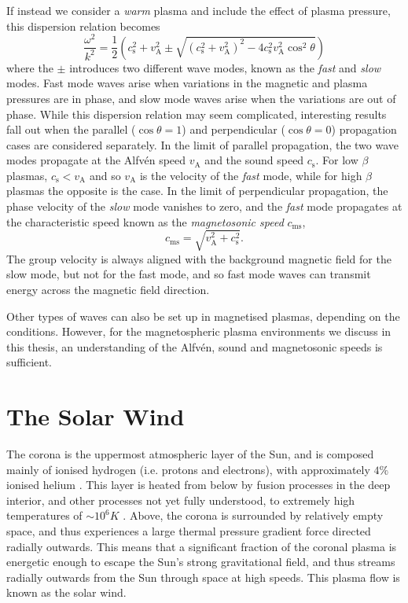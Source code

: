 If instead we consider a \textit{warm} plasma and include the effect of plasma pressure, this dispersion relation becomes
\begin{equation}
\frac{\omega^2}{k^2} = \frac{1}{2}\left(c_\mathrm{s}^2+v_\mathrm{A}^2\pm\sqrt{(c_\mathrm{s}^2+v_\mathrm{A}^2)^2-4c_\mathrm{s}^2v_\mathrm{A}^2\cos^2\theta}\right)
\end{equation}
where the $\pm$ introduces two different wave modes, known as the \textit{fast} and \textit{slow} modes. Fast mode waves arise when variations in the magnetic and plasma pressures are in phase, and slow mode waves arise when the variations are out of phase. While this dispersion relation may seem complicated, interesting results fall out when the parallel ($\cos\theta = 1$) and perpendicular ($\cos\theta = 0$) propagation cases are considered separately. In the limit of parallel propagation, the two wave modes propagate at the Alfv\'en speed $v_\mathrm{A}$ and the sound speed $c_\mathrm{s}$. For low $\beta$ plasmas, $c_\mathrm{s}<v_\mathrm{A}$ and so $v_\mathrm{A}$ is the velocity of the \textit{fast} mode, while for high $\beta$ plasmas the opposite is the case. In the limit of perpendicular propagation, the phase velocity of the \textit{slow} mode vanishes to zero, and the \textit{fast} mode propagates at the characteristic speed known as the \textit{magnetosonic speed} $c_\mathrm{ms}$,
\begin{equation}
c_\mathrm{ms} = \sqrt{v_\mathrm{A}^2+c_\mathrm{s}^2}.
\end{equation}
The group velocity is always aligned with the background magnetic field for the slow mode, but not for the fast mode, and so fast mode waves can transmit energy across the magnetic field direction. 
 
Other types of waves can also be set up in magnetised plasmas, depending on the conditions. However, for the magnetospheric plasma environments we discuss in this thesis, an understanding of the Alfv\'en, sound and magnetosonic speeds is sufficient.

\section{The Solar Wind} \label{intro:sec:solarwind}
The corona is the uppermost atmospheric layer of the Sun, and is composed mainly of ionised hydrogen (i.e. protons and electrons), with approximately $4\%$ ionised helium \citep{robbins1970}. This layer is heated from below by fusion processes in the deep interior, and other processes not yet fully understood, to extremely high temperatures of ${\sim}10^6\si{K}$ \citep{warren2009}. Above, the corona is surrounded by relatively empty space, and thus experiences a large thermal pressure gradient force directed radially outwards. This means that a significant fraction of the coronal plasma is energetic enough to escape the Sun's strong gravitational field, and thus streams radially outwards from the Sun through space at high speeds. This plasma flow is known as the solar wind.

